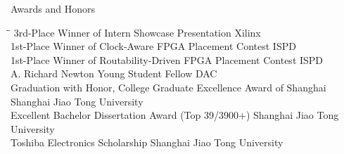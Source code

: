 
\begin{rSection}{Awards and Honors}
\begin{tabbing}
\hspace{4.55in}\= \hspace{1.95in}\= \kill
3rd-Place Winner of Intern Showcase Presentation \> Xilinx  \\
1st-Place Winner of Clock-Aware FPGA Placement Contest \> ISPD  \\
1st-Place Winner of Routability-Driven FPGA Placement Contest \> ISPD  \\
A. Richard Newton Young Student Fellow \> DAC  \\
Graduation with Honor, College Graduate Excellence Award of Shanghai \> Shanghai Jiao Tong University  \\
Excellent Bachelor Dissertation Award (Top 39/3900+) \> Shanghai Jiao Tong University  \\
Toshiba Electronics Scholarship \> Shanghai Jiao Tong University  \\

\end{tabbing}
\end{rSection}

